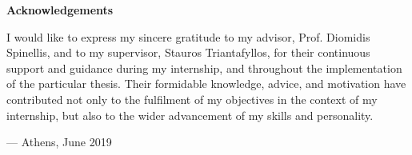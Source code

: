 \begin{center}
\textbf{\large Acknowledgements}
\end{center}

I would like to express my sincere gratitude
to my advisor, Prof. Diomidis Spinellis,
and to my supervisor, Stauros Triantafyllos,
for their continuous support and guidance
during my internship,
and throughout the implementation
of the particular thesis.
Their formidable knowledge, advice, and motivation
have contributed not only to the fulfilment
of my objectives in the context of my internship,
but also to the wider advancement of my skills and personality.

\vspace{1cm}

\hfill --- Athens, June 2019

